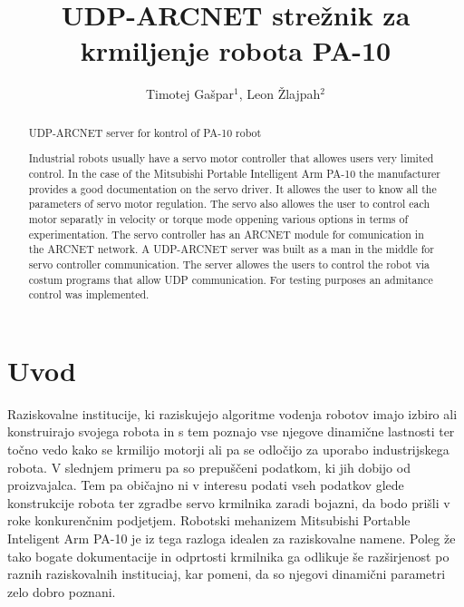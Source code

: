 \documentclass[a4paper]{article}
\begin{document}
\title{UDP-ARCNET strežnik za krmiljenje robota PA-10}

\author{Timotej Gašpar$^{1}$, Leon Žlajpah$^{2}$} %



\maketitle


\begin{abstract}{UDP-ARCNET server for kontrol of PA-10 robot}

Industrial robots usually have a servo motor controller that allowes users very limited control. In the case of the Mitsubishi Portable Intelligent Arm PA-10 the manufacturer provides a good documentation on the servo driver. It allowes the user to know all the parameters of servo motor regulation. The servo also allowes the user to control each motor separatly in velocity or torque mode oppening various options in terms of experimentation. The servo controller has an ARCNET module for comunication in the ARCNET network.
A UDP-ARCNET server was built as a man in the middle for servo controller communication. The server allowes the users to control the robot via costum programs that allow UDP communication. For testing purposes an admitance control was implemented.

\end{abstract}



\section{Uvod}

Raziskovalne institucije, ki raziskujejo algoritme vodenja robotov imajo izbiro ali konstruirajo svojega robota in s tem poznajo vse njegove dinamične lastnosti ter točno vedo kako se krmilijo motorji ali pa se odločijo za uporabo industrijskega robota. V slednjem primeru pa so prepuščeni podatkom, ki jih dobijo od proizvajalca. Tem pa običajno ni v interesu podati vseh podatkov glede konstrukcije robota ter zgradbe servo krmilnika zaradi bojazni, da bodo prišli v roke konkurenčnim podjetjem.
Robotski mehanizem Mitsubishi Portable Inteligent Arm PA-10 je iz tega razloga idealen za raziskovalne namene. Poleg že tako bogate dokumentacije in odprtosti krmilnika ga odlikuje še razširjenost po raznih raziskovalnih instituciaj, kar pomeni, da so njegovi dinamični parametri zelo dobro poznani. 
\end{document}
